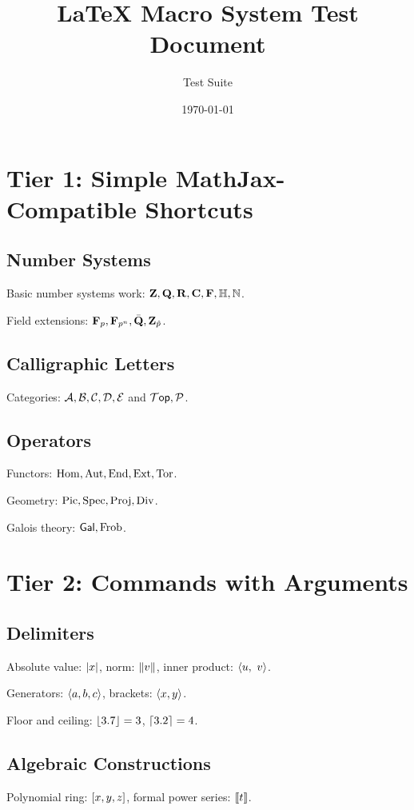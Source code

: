 \documentclass[11pt]{scrartcl}
\title{LaTeX Macro System Test Document}
\author{Test Suite}
\date{\today}
\begin{document}
\maketitle

\section{Tier 1: Simple MathJax-Compatible Shortcuts}

\subsection{Number Systems}
Basic number systems work: $\ZZ, \QQ, \RR, \CC, \FF, \HH, \NN$.

Field extensions: $\FFp, \FFpn, \QQbar, \ZZpadic$.

\subsection{Calligraphic Letters}
Categories: $\mca, \mcb, \mcc, \mcd, \mce$ and $\mcTop, \Path$.

\subsection{Operators}
Functors: $\Hom, \Aut, \Endo, \Ext, \Tor$.

Geometry: $\Pic, \Spec, \Proj, \Div$.

Galois theory: $\Gal, \Frob$.

\section{Tier 2: Commands with Arguments}

\subsection{Delimiters}
Absolute value: $\abs{x}$, norm: $\norm{v}$, inner product: $\inner{u}{v}$.

Generators: $\generators{a, b, c}$, brackets: $\bracket{x, y}$.

Floor and ceiling: $\floor{3.7} = 3$, $\ceiling{3.2} = 4$.

\subsection{Algebraic Constructions}
Polynomial ring: $\polynomialring{x, y, z}$, formal power series: $\fps{t}$.
\end{document}
